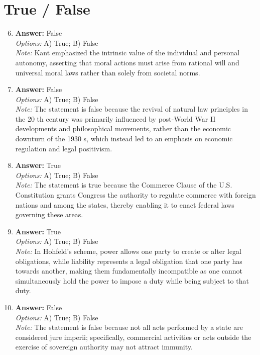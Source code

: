 \documentclass[12pt]{article}
\begin{document}
\section*{True / False}
\begin{enumerate}[label=\arabic*.]
\setcounter{enumi}{5}
\item \textbf{Answer:} False
\\ \textit{Options:} A) True; B) False
\\ \textit{Note:} Kant emphasized the intrinsic value of the individual and personal autonomy, asserting that moral actions must arise from rational will and universal moral laws rather than solely from societal norms.
\item \textbf{Answer:} False
\\ \textit{Options:} A) True; B) False
\\ \textit{Note:} The statement is false because the revival of natural law principles in the 20 th century was primarily influenced by post-World War II developments and philosophical movements, rather than the economic downturn of the 1930 s, which instead led to an emphasis on economic regulation and legal positivism.
\item \textbf{Answer:} True
\\ \textit{Options:} A) True; B) False
\\ \textit{Note:} The statement is true because the Commerce Clause of the U.S. Constitution grants Congress the authority to regulate commerce with foreign nations and among the states, thereby enabling it to enact federal laws governing these areas.
\item \textbf{Answer:} True
\\ \textit{Options:} A) True; B) False
\\ \textit{Note:} In Hohfeld's scheme, power allows one party to create or alter legal obligations, while liability represents a legal obligation that one party has towards another, making them fundamentally incompatible as one cannot simultaneously hold the power to impose a duty while being subject to that duty.
\item \textbf{Answer:} False
\\ \textit{Options:} A) True; B) False
\\ \textit{Note:} The statement is false because not all acts performed by a state are considered jure imperii; specifically, commercial activities or acts outside the exercise of sovereign authority may not attract immunity.
\end{enumerate}
\end{document}
